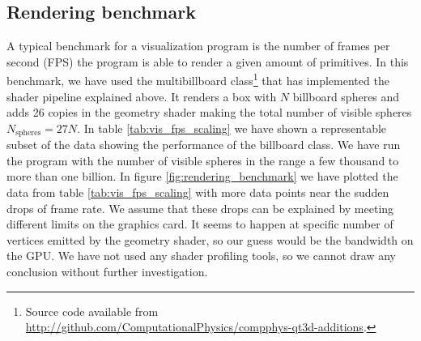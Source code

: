 \subsection{Rendering benchmark}
\label{sec:vis_benchmark}
A typical benchmark for a visualization program is the number of frames per second (FPS) the program is able to render a given amount of primitives. In this benchmark, we have used the multibillboard class\footnote{Source code available from \url{http://github.com/ComputationalPhysics/compphys-qt3d-additions}.} that has implemented the shader pipeline explained above. It renders a box with $N$ billboard spheres and adds 26 copies in the geometry shader making the total number of visible spheres $N_\text{spheres} = 27N$. In table \ref{tab:vis_fps_scaling} we have shown a representable subset of the data showing the performance of the billboard class. We have run the program with the number of visible spheres in the range a few thousand to more than one billion. In figure \ref{fig:rendering_benchmark} we have plotted the data from table \ref{tab:vis_fps_scaling} with more data points near the sudden drops of frame rate. We assume that these drops can be explained by meeting different limits on the graphics card. It seems to happen at specific number of vertices emitted by the geometry shader, so our guess would be the bandwidth on the GPU. We have not used any shader profiling tools, so we cannot draw any conclusion without further investigation. 
